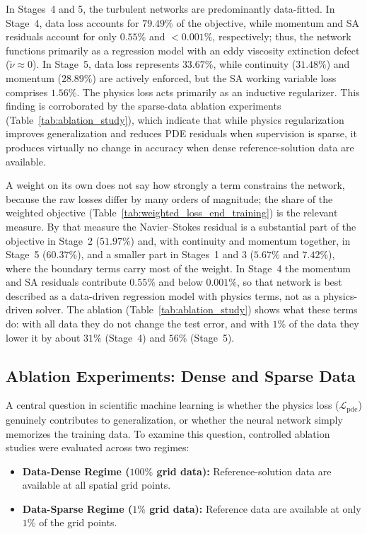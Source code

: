 \documentclass[11pt,a4paper]{article}
\begin{document}
In Stages~4 and 5, the turbulent networks are predominantly data-fitted. In Stage~4, data loss accounts for $79.49\%$ of the objective, while momentum and SA residuals account for only $0.55\%$ and $<0.001\%$, respectively; thus, the network functions primarily as a regression model with an eddy viscosity extinction defect ($\tilde{\nu} \approx 0$). In Stage~5, data loss represents $33.67\%$, while continuity ($31.48\%$) and momentum ($28.89\%$) are actively enforced, but the SA working variable loss comprises $1.56\%$. The physics loss acts primarily as an inductive regularizer. This finding is corroborated by the sparse-data ablation experiments (Table~\ref{tab:ablation_study}), which indicate that while physics regularization improves generalization and reduces PDE residuals when supervision is sparse, it produces virtually no change in accuracy when dense reference-solution data are available.

A weight on its own does not say how strongly a term constrains the network, because the raw losses differ by many orders of magnitude; the share of the weighted objective (Table~\ref{tab:weighted_loss_end_training}) is the relevant measure. By that measure the Navier--Stokes residual is a substantial part of the objective in Stage~2 ($51.97\%$) and, with continuity and momentum together, in Stage~5 ($60.37\%$), and a smaller part in Stages~1 and 3 ($5.67\%$ and $7.42\%$), where the boundary terms carry most of the weight. In Stage~4 the momentum and SA residuals contribute $0.55\%$ and below $0.001\%$, so that network is best described as a data-driven regression model with physics terms, not as a physics-driven solver. The ablation (Table~\ref{tab:ablation_study}) shows what these terms do: with all data they do not change the test error, and with $1\%$ of the data they lower it by about $31\%$ (Stage~4) and $56\%$ (Stage~5).


\subsection{Ablation Experiments: Dense and Sparse Data}
A central question in scientific machine learning is whether the physics loss ($\mathcal{L}_{\mathrm{pde}}$) genuinely contributes to generalization, or whether the neural network simply memorizes the training data. To examine this question, controlled ablation studies were evaluated across two regimes:
\begin{itemize}[leftmargin=1.5em]
    \item \textbf{Data-Dense Regime ($100\%$ grid data):} Reference-solution data are available at all spatial grid points.
    \item \textbf{Data-Sparse Regime ($1\%$ grid data):} Reference data are available at only $1\%$ of the grid points.
\end{itemize}
\end{document}
